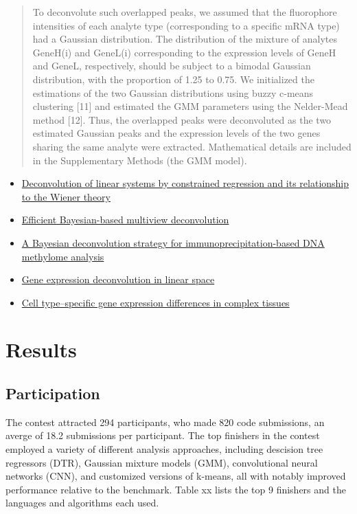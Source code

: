 \documentclass[]{article}
\begin{document}
\begin{quote}
To deconvolute such overlapped peaks, we assumed that the fluorophore
intensities of each analyte type (corresponding to a specific mRNA type)
had a Gaussian distribution. The distribution of the mixture of analytes
GeneH(i) and GeneL(i) corresponding to the expression levels of GeneH
and GeneL, respectively, should be subject to a bimodal Gaussian
distribution, with the proportion of 1.25 to 0.75. We initialized the
estimations of the two Gaussian distributions using buzzy c-means
clustering {[}11{]} and estimated the GMM parameters using the
Nelder-Mead method {[}12{]}. Thus, the overlapped peaks were
deconvoluted as the two estimated Gaussian peaks and the expression
levels of the two genes sharing the same analyte were extracted.
Mathematical details are included in the Supplementary Methods (the GMM
model).
\end{quote}

\begin{itemize}
\item
  \href{https://ieeexplore.ieee.org/abstract/document/4044778}{Deconvolution
  of linear systems by constrained regression and its relationship to
  the Wiener theory}
\item
  \href{https://www.nature.com/articles/nmeth.2929}{Efficient
  Bayesian-based multiview deconvolution}
\item
  \href{https://www.nature.com/articles/nbt1414}{A Bayesian
  deconvolution strategy for immunoprecipitation-based DNA methylome
  analysis}
\item
  \href{https://www.nature.com/articles/nmeth.1830}{Gene expression
  deconvolution in linear space}
\item
  \href{https://www.nature.com/articles/nmeth.1439}{Cell type--specific
  gene expression differences in complex tissues}
\end{itemize}

\hypertarget{results}{%
\section{Results}\label{results}}

\hypertarget{participation}{%
\subsection{Participation}\label{participation}}

The contest attracted 294 participants, who made 820 code submissions,
an averge of 18.2 submissions per participant. The top finishers in the
contest employed a variety of different analysis approaches, including
descision tree regressors (DTR), Gaussian mixture models (GMM),
convolutional neural networks (CNN), and customized versions of k-means,
all with notably improved performance relative to the benchmark. Table
xx lists the top 9 finishers and the languages and algorithms each used.
\end{document}
